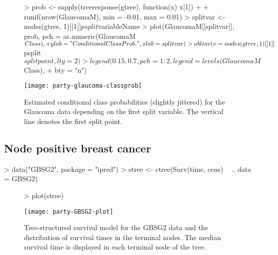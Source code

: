 \documentclass{Z}
\begin{document}
\begin{figure}[ht!]
\begin{center}
\begin{Schunk}
\begin{Sinput}
> prob <- sapply(treeresponse(gtree), function(x) x[1]) + 
+     runif(nrow(GlaucomaM), min = -0.01, max = 0.01)
> splitvar <- nodes(gtree, 1)[[1]]$psplit$variableName
> plot(GlaucomaM[[splitvar]], prob, pch = as.numeric(GlaucomaM$Class), 
+     ylab = "Conditional Class Prob.", xlab = splitvar)
> abline(v = nodes(gtree, 1)[[1]]$psplit$splitpoint, lty = 2)
> legend(0.15, 0.7, pch = 1:2, legend = levels(GlaucomaM$Class), 
+     bty = "n")
\end{Sinput}
\end{Schunk}
\texttt{[image: party-glaucoma-classprob]}
\caption{Estimated conditional class probabilities (slightly jittered) 
         for the Glaucoma data depending on the first split variable. 
         The vertical line denotes the first split point. \label{glaucoma-probplot}}
\end{center}
\end{figure}

\subsection{Node positive breast cancer}

\begin{Schunk}
\begin{Sinput}
> data("GBSG2", package = "ipred")
> stree <- ctree(Surv(time, cens) ~ ., data = GBSG2)
\end{Sinput}
\end{Schunk}

\begin{figure}[t]
\begin{center}
\begin{Schunk}
\begin{Sinput}
> plot(stree)
\end{Sinput}
\end{Schunk}
\texttt{[image: party-GBSG2-plot]}
\caption{Tree-structured survival model for the GBSG2 data and the distribution of 
survival times in the terminal nodes. The median survival time is displayed in
each terminal node of the tree. \label{gbsg2}}
\end{center}
\end{figure}  
\end{document}
